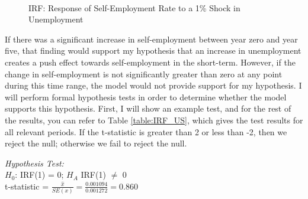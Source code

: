 \documentclass[]{ecca}
\begin{document}
\begin{figure}[!h]
	\centering
	\medskip\\
	\caption{IRF: Response of Self-Employment Rate to a 1\% Shock in Unemployment }
	\label{fig:IRF_US}
\end{figure}

If there was a significant increase in self-employment between year zero and year five, that finding would support my hypothesis that an increase in unemployment creates a push effect towards self-employment in the short-term. However, if the change in self-employment is not significantly greater than zero at any point during this time range, the model would not provide support for my hypothesis. I will perform formal hypothesis tests in order to determine whether the model supports this hypothesis. First, I will show an example test, and for the rest of the results, you can refer to Table \ref{table:IRF_US}, which gives the test results for all relevant periods. If the t-statistic is greater than 2 or less than -2, then we reject the null; otherwise we fail to reject the null. 

\begin{center}
	\emph{Hypothesis Test:} \\
$H_0$: IRF(1) = 0;  $H_A$ IRF(1) $\neq$ 0 \\
t-statistic = $\frac{\hat{x}}{SE(x)} =\frac{0.001094}{0.001272}=0.860$ \\ 
\end{center} 
\end{document}
